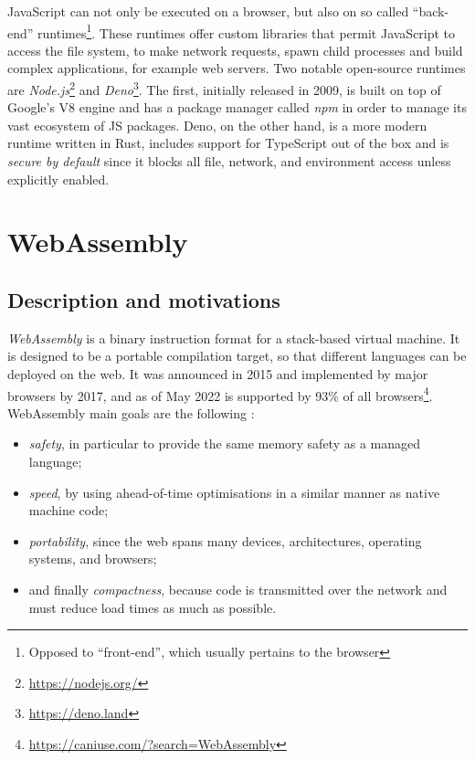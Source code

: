 JavaScript can not only be executed on a browser, but also on so called ``back-end''
runtimes\footnote{Opposed to ``front-end'', which usually pertains to the browser}.
These runtimes offer custom libraries that permit JavaScript to access the file system, to make network requests,
spawn child processes and build complex applications, for example web servers.
Two notable open-source runtimes are \textit{Node.js}\footnote{\url{https://nodejs.org/}} and \textit{Deno}\footnote{\url{https://deno.land}}.
The first, initially released in 2009, is built on top of Google's V8 engine and has a package manager called \textit{npm}
in order to manage its vast ecosystem of JS packages.
Deno, on the other hand, is a more modern runtime written in Rust, includes support for TypeScript out of the box
and is \textit{secure by default} since it blocks all file, network, and environment access unless explicitly enabled.

\section{WebAssembly}

\subsection{Description and motivations}

\textit{WebAssembly} \cite{wasm-website} is a binary instruction format for a stack-based virtual machine.
It is designed to be a portable compilation target, so that different languages can be deployed on the web.
It was announced in 2015 and implemented by major browsers by 2017, and as of May 2022 is supported
by 93\% of all browsers\footnote{\url{https://caniuse.com/?search=WebAssembly}}.
WebAssembly main goals are the following \cite{bringing-the-web-up-to-speed-2017}:
\begin{itemize}
  \item \textit{safety}, in particular to provide the same memory safety as a managed language;
  \item \textit{speed}, by using ahead-of-time optimisations in a similar manner as native machine code;
  \item \textit{portability}, since the web spans many devices, architectures, operating systems, and browsers;
  \item and finally \textit{compactness}, because code is transmitted over the network and must reduce load times as much as possible.
\end{itemize}

